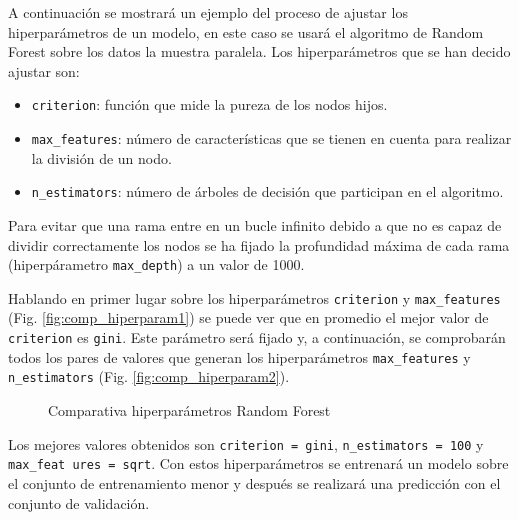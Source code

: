 A continuación se mostrará un ejemplo del proceso de ajustar los hiperparámetros de un modelo, en este caso se usará el algoritmo de Random Forest sobre los datos la muestra paralela. Los hiperparámetros que se han decido ajustar son:
\begin{itemize}
    \item \texttt{criterion}: función que mide la pureza de los nodos hijos.
    \item \texttt{max\_features}: número de características que se tienen en cuenta para realizar la división de un nodo.
    \item \texttt{n\_estimators}: número de árboles de decisión que participan en el algoritmo.
\end{itemize}

Para evitar que una rama entre en un bucle infinito debido a que no es capaz de dividir correctamente los nodos se ha fijado la profundidad máxima de cada rama (hiperpárametro \texttt{max\_depth}) a un valor de 1000. 

Hablando en primer lugar sobre los hiperparámetros \texttt{criterion} y \texttt{max\_features} (Fig. \ref{fig:comp_hiperparam1}) se puede ver que en promedio el mejor valor de \texttt{criterion} es \texttt{gini}. Este parámetro será fijado y, a continuación, se comprobarán todos los pares de valores que generan los hiperparámetros \texttt{max\_features} y \texttt{n\_estimators} (Fig. \ref{fig:comp_hiperparam2}).

\begin{figure}
    \centering
    \quad
    \caption{Comparativa hiperparámetros Random Forest}
    \label{fig:comp_hiperparam}
\end{figure}

Los mejores valores obtenidos son \texttt{criterion = gini}, \texttt{n\_estimators = 100} y \texttt{max\_feat ures = sqrt}. Con estos hiperparámetros se entrenará un modelo sobre el conjunto de entrenamiento menor y después se realizará una predicción con el conjunto de validación.

